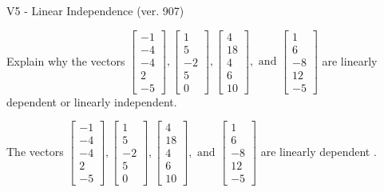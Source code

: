 \begin{exercise}
  \begin{exerciseTitle}V5 - Linear Independence (ver. 907)\end{exerciseTitle}
  \begin{exerciseStatement}
    Explain why the vectors \(\left[\begin{array}{r}
-1 \\
-4 \\
-4 \\
2 \\
-5
\end{array}\right] , \left[\begin{array}{r}
1 \\
5 \\
-2 \\
5 \\
0
\end{array}\right] , \left[\begin{array}{r}
4 \\
18 \\
4 \\
6 \\
10
\end{array}\right] , \text{ and } \left[\begin{array}{r}
1 \\
6 \\
-8 \\
12 \\
-5
\end{array}\right]\) are linearly dependent or linearly independent.	


  \end{exerciseStatement}
  \begin{exerciseAnswer}
   The vectors \(\left[\begin{array}{r}
-1 \\
-4 \\
-4 \\
2 \\
-5
\end{array}\right] , \left[\begin{array}{r}
1 \\
5 \\
-2 \\
5 \\
0
\end{array}\right] , \left[\begin{array}{r}
4 \\
18 \\
4 \\
6 \\
10
\end{array}\right] , \text{ and } \left[\begin{array}{r}
1 \\
6 \\
-8 \\
12 \\
-5
\end{array}\right]\) are 
  	 linearly dependent  .
  


  \end{exerciseAnswer}
\end{exercise}